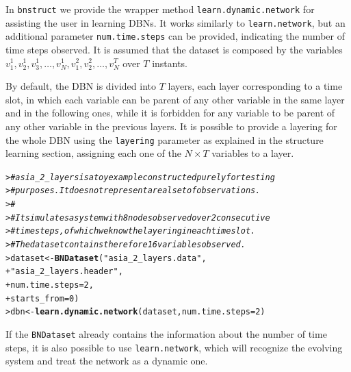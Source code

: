 \documentclass{article}\usepackage[]{graphicx}\usepackage[]{color}
\makeatletter
\newcommand{\hlnum}[1]{\textcolor[rgb]{0.686,0.059,0.569}{#1}}%
\newcommand{\hlstr}[1]{\textcolor[rgb]{0.192,0.494,0.8}{#1}}%
\newcommand{\hlcom}[1]{\textcolor[rgb]{0.678,0.584,0.686}{\textit{#1}}}%
\newcommand{\hlstd}[1]{\textcolor[rgb]{0.345,0.345,0.345}{#1}}%
\newcommand{\hlkwb}[1]{\textcolor[rgb]{0.69,0.353,0.396}{#1}}%
\newcommand{\hlkwc}[1]{\textcolor[rgb]{0.333,0.667,0.333}{#1}}%
\newcommand{\hlkwd}[1]{\textcolor[rgb]{0.737,0.353,0.396}{\textbf{#1}}}%
\newenvironment{kframe}{%
 \def\at@end@of@kframe{}%
 \ifinner\ifhmode%
  \def\at@end@of@kframe{\end{minipage}}%
  \begin{minipage}{\columnwidth}%
 \fi\fi%
 \def\FrameCommand##1{\hskip\@totalleftmargin \hskip-\fboxsep
 \colorbox{shadecolor}{##1}\hskip-\fboxsep
     \hskip-\linewidth \hskip-\@totalleftmargin \hskip\columnwidth}%
 \MakeFramed {\advance\hsize-\width
   \@totalleftmargin\z@ \linewidth\hsize
   \@setminipage}}%
 {\par\unskip\endMakeFramed%
 \at@end@of@kframe}
\newenvironment{knitrout}{}{} %
\newcommand{\Rpackage}[1]{{\texttt{#1}}}
\newcommand{\Rmethod}[1]{{\texttt{#1}}}
\newcommand{\Rfunarg}[1]{{\texttt{#1}}}
\makeatother
\begin{document}
In \Rpackage{bnstruct} we provide the wrapper method \Rmethod{learn.dynamic.network} for assisting the user in
learning DBNs. It works similarly to \Rmethod{learn.network}, but an additional parameter \Rfunarg{num.time.steps}
can be provided, indicating the number of time steps observed. It is assumed that the dataset is composed by the 
variables $v_{1}^{1}, v_2^1, v_3^1, \dots, v_N^1, v_1^2, v_2^2, \dots, v_N^T$ over $T$ instants.

By default, the DBN is divided into $T$ layers, each layer corresponding to a time slot,
in which each variable can be parent of any other variable
in the same layer and in the following ones, while it is forbidden for any variable to be parent of any other
variable in the previous layers.
It is possible to provide a layering for the whole DBN using the \Rfunarg{layering} parameter as explained
in the structure learning section, assigning each one of the $N \times T$ variables to a layer.

\begin{knitrout}
\color{fgcolor}\begin{kframe}
\begin{alltt}
\hlstd{> }\hlcom{# asia_2_layers is a toy example constructed purely for testing}
\hlstd{> }\hlcom{# purposes. It does not represent a real set of observations.}
\hlstd{> }\hlcom{#}
\hlstd{> }\hlcom{# It simulates a system with 8 nodes observed over 2 consecutive}
\hlstd{> }\hlcom{# time steps, of which we know the layering in each time slot.}
\hlstd{> }\hlcom{# The dataset contains therefore 16 variables observed.}
\hlstd{> }\hlstd{dataset} \hlkwb{<-} \hlkwd{BNDataset}\hlstd{(}\hlstr{"asia_2_layers.data"}\hlstd{,}
\hlstd{+ }                     \hlstr{"asia_2_layers.header"}\hlstd{,}
\hlstd{+ }                     \hlkwc{num.time.steps} \hlstd{=} \hlnum{2}\hlstd{,}
\hlstd{+ }                     \hlkwc{starts_from} \hlstd{=} \hlnum{0}\hlstd{)}
\hlstd{> }\hlstd{dbn} \hlkwb{<-} \hlkwd{learn.dynamic.network}\hlstd{(dataset,} \hlkwc{num.time.steps} \hlstd{=} \hlnum{2}\hlstd{)}
\end{alltt}
\end{kframe}
\end{knitrout}

If the \texttt{BNDataset} already contains the information about the number of time steps,
it is also possible to use \texttt{learn.network}, which will recognize the evolving system
and treat the network as a dynamic one.
\end{document}
